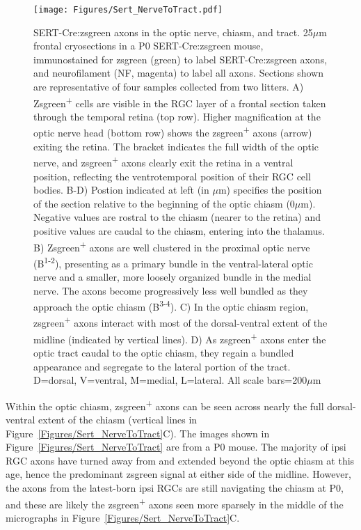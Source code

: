 \begin{figure}[hbtp]
	\begin{center}
		\texttt{[image: Figures/Sert\_NerveToTract.pdf]}
		\caption[SERT-Cre:zsgreen axons in the optic nerve, chiasm, and tract.]
		{SERT-Cre:zsgreen axons in the optic nerve, chiasm, and tract. 
		25$\mu$m frontal cryosections in a P0 SERT-Cre:zsgreen mouse, immunostained for zsgreen (green) to label SERT-Cre:zsgreen axons, and neurofilament (NF, magenta) to label all axons.
		Sections shown are representative of four samples collected from two litters. %
		A) Zsgreen\textsuperscript{+} cells are visible in the RGC layer of a frontal section taken through the temporal retina (top row).
		Higher magnification at the optic nerve head (bottom row) shows the zsgreen\textsuperscript{+} axons (arrow) exiting the retina.
		The bracket indicates the full width of the optic nerve, and zsgreen\textsuperscript{+} axons clearly exit the retina in a ventral position, reflecting the ventrotemporal position of their RGC cell bodies.
		B-D) Postion indicated at left (in $\mu$m) specifies the position of the section relative to the beginning of the optic chiasm (0$\mu$m).
		Negative values are rostral to the chiasm (nearer to the retina) and positive values are caudal to the chiasm, entering into the thalamus.
		B) Zsgreen\textsuperscript{+} axons are well clustered in the proximal optic nerve (B\textsuperscript{1-2}), presenting as a primary bundle in the ventral-lateral optic nerve and a smaller, more loosely organized bundle in the medial nerve. 
		The axons become progressively less well bundled as they approach the optic chiasm (B\textsuperscript{3-4}). 
		C) In the optic chiasm region, zsgreen\textsuperscript{+} axons interact with most of the dorsal-ventral extent of the midline (indicated by vertical lines).
		D) As zsgreen\textsuperscript{+} axons enter the optic tract caudal to the optic chiasm, they regain a bundled appearance and segregate to the lateral portion of the tract.
		D=dorsal, V=ventral, M=medial, L=lateral. 
		All scale bars=200$\mu$m}
		\label{Figures/SertNerveToTract}
	\end{center}
\end{figure}

Within the optic chiasm, zsgreen\textsuperscript{+} axons can be seen across nearly the full dorsal-ventral extent of the chiasm (vertical lines in Figure~\ref{Figures/Sert_NerveToTract}C).
The images shown in Figure~\ref{Figures/Sert_NerveToTract} are from a P0 mouse.
The majority of ipsi RGC axons have turned away from and extended beyond the optic chiasm at this age, hence the predominant zsgreen signal at either side of the midline.
However, the axons from the latest-born ipsi RGCs are still navigating the chiasm at P0, and these are likely the zsgreen\textsuperscript{+} axons seen more sparsely in the middle of the micrographs in Figure~\ref{Figures/Sert_NerveToTract}C.

